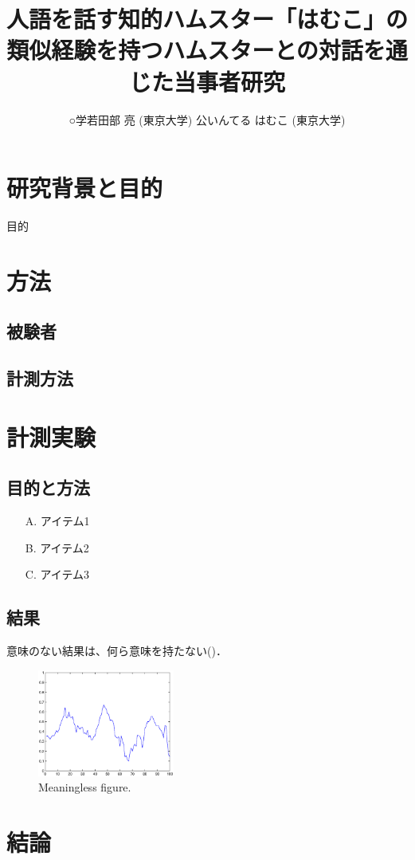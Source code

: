 \documentclass[10pt,a4paper]{jsarticle}
\title{人語を話す知的ハムスター「はむこ」の \\
類似経験を持つハムスターとの対話を通じた当事者研究}
\author{
○学\hspace{1zw}若田部 亮 (東京大学)\hspace{2zw}
公\hspace{1zw}いんてる はむこ (東京大学)}
\begin{document}
\setlength{\baselineskip}{4.685truemm}%
\maketitle
\thispagestyle{empty}

\section{研究背景と目的}

目的 \cite{Cornwell1975175, 110002427721}


\section{方法}
\subsection{被験者}
\subsection{計測方法}

\section{計測実験}
\subsection{目的と方法}

\begin{itemize}
    \item[A.] アイテム1
    \item[B.] アイテム2
    \item[C.] アイテム3
\end{itemize}

\subsection{結果}
意味のない結果は、何ら意味を持たない()．

\begin{figure}[t!]
 \centering
  \includegraphics[width=0.40\textwidth]{figure/sample.eps}
 \caption{Meaningless figure.}
 \label{fig:meaningless}
\end{figure}


\section{結論}


\begin{footnotesize}
%


\end{footnotesize}
\end{document}
